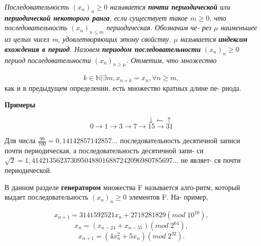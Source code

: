 \begin{determ}
\slshape{Последовательность $(x_{n})_{n} \geqslant 0$} называется \textbf{почти периодической} \linebreak или \textbf{периодической некоторого ранга}, если существует такое \linebreak $m \geqslant 0$, что последовательность $(x_{n})_{n \leqslant m}$ периодическая. Обозначим че- \linebreak рез $\mu$ наименьшее из целых чисел m, удовлетворяющих этому свойству. \linebreak $\mu$ называется \textbf{индексом вхождения в период}. Назовем \textbf{периодом \linebreak последовательности} $(x_{n})_{n} \geqslant 0$ период последовательности $(x_{n})_{n \geqslant \mu}$. \linebreak Отметим, что множество \par 
{$${k \in \mathbb{N}|\exists m, x_{n+k} = x_{n}, \forall n \geqslant m},$$} \linebreak
как и в предыдущем определении, есть множество кратных длине пе- \linebreak риода.
\end{determ}
\textbf{Примеры} \par
{} \par 
$$\;\;\;\;\;\;\;\;\;\;\;\;\;\;\;\;\;\;\;\;\;\;\;\;\;\;\;\;\;\downarrow \leftharpoonup \uparrow$$
$$0 \to 1 \to 3 \to 7 \to 15 \to 31$$ \par 
Для числа $\frac{99}{700} = 0,14\underline{142857}142857...$ последовательность десятичной \linebreak записи почти периодическая, а последовательность десятичной запи- \linebreak си $\sqrt{2} = 1,4142135623730950488016887242096980785697...$ не являет- \linebreak ся почти периодической. \par 
В данном разделе \textbf{генератором} множества F называется алго-\linebreak ритм, который выдает последовательность $(x_{n})_{n}\geqslant 0$ элементов F. На- \linebreak пример, \par 
$$x_{n+1} = 3141592521 x_{n} + 2718281829 (mod \; 10^{10}),$$
$$x_{n} = (x_{n-24}+x_{n-55})(mod \; 2^{64}),$$
$$x_{n+1} = (4x_{n}^{2} + 5x_{n})(mod \; 2^{32}).$$ \par \newpage 

